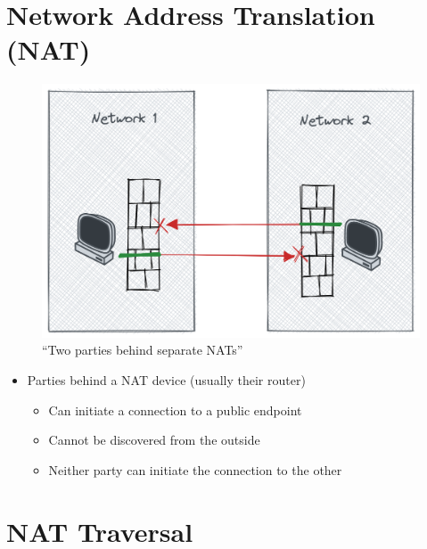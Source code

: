 \hypertarget{network-address-translation-nat}{%
\chapter{Network Address Translation
(NAT)}\label{network-address-translation-nat}}

\begin{figure}
\centering
\includegraphics[width=\textwidth,height=0.66\textheight]{presentation/../figures/nat-intro.png}
\caption{``Two parties behind separate NATs''\label{nat-intro}}
\end{figure}

\begin{itemize}
\tightlist
\item
  Parties behind a NAT device (usually their router)

  \begin{itemize}
  \tightlist
  \item
    Can initiate a connection to a public endpoint
  \item
    Cannot be discovered from the outside
  \item
    Neither party can initiate the connection to the other
  \end{itemize}
\end{itemize}

\hypertarget{nat-traversal}{%
\chapter{NAT Traversal}\label{nat-traversal}}

